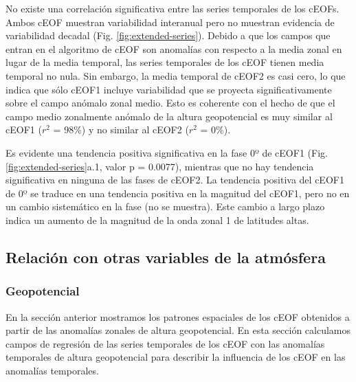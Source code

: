 \documentclass[12pt,oneside]{reedthesis}
\begin{document}
No existe una correlación significativa entre las series temporales de los cEOFs.
Ambos cEOF muestran variabilidad interanual pero no muestran evidencia de variabilidad decadal (Fig. \ref{fig:extended-series}).
Debido a que los campos que entran en el algoritmo de cEOF son anomalías con respecto a la media zonal en lugar de la media temporal, las series temporales de los cEOF tienen media temporal no nula.
Sin embargo, la media temporal de cEOF2 es casi cero, lo que indica que sólo cEOF1 incluye variabilidad que se proyecta significativamente sobre el campo anómalo zonal medio.
Esto es coherente con el hecho de que el campo medio zonalmente anómalo de la altura geopotencial es muy similar al cEOF1 (\(r^2\) = 98\%) y no similar al cEOF2 (\(r^2\) = 0\%).

Es evidente una tendencia positiva significativa en la fase 0º de cEOF1 (Fig. \ref{fig:extended-series}a.1, valor p = 0.0077), mientras que no hay tendencia significativa en ninguna de las fases de cEOF2.
La tendencia positiva del cEOF1 de 0º se traduce en una tendencia positiva en la magnitud del cEOF1, pero no en un cambio sistemático en la fase (no se muestra).
Este cambio a largo plazo indica un aumento de la magnitud de la onda zonal 1 de latitudes altas.

\hypertarget{relaciuxf3n-con-otras-variables-de-la-atmuxf3sfera}{%
\subsection{Relación con otras variables de la atmósfera}\label{relaciuxf3n-con-otras-variables-de-la-atmuxf3sfera}}

\hypertarget{geopotencial}{%
\subsubsection{Geopotencial}\label{geopotencial}}

En la sección anterior mostramos los patrones espaciales de los cEOF obtenidos a partir de las anomalías zonales de altura geopotencial.
En esta sección calculamos campos de regresión de las series temporales de los cEOF con las anomalías temporales de altura geopotencial para describir la influencia de los cEOF en las anomalías temporales.
\end{document}
